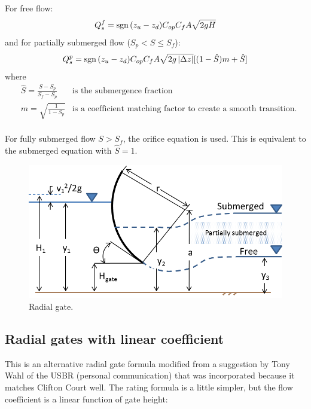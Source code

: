 For free flow:
$$
Q_s^f = \operatorname{sgn}{(z_{u} - z_{d})} C_{op} C_{f} A \sqrt{2g H}
$$
and for partially submerged flow ($S_p < S \le S_f$):
$$
Q_s^p = \operatorname{sgn}{(z_{u} - z_{d})} C_{op} C_{f} A \sqrt{2g \left|\Delta z\right|}[(1-\hat{S})m+\hat{S}]
$$
where
\begin{align*}
&\hat{S}=\frac{S-S_p}{S_f-S_p} & \text{is the submergence fraction} \\
&m = \sqrt{\frac{1}{1-S_p}} & \text{is a coefficient matching factor to create a smooth transition}. \\
\end{align*}

For fully submerged flow $S>S_f$, the orifice equation is used. This is equivalent to the submerged equation with
$\hat{S}=1$.


\begin{figure}
	\centering
		\includegraphics[scale=1]{image/radial_gate}
	\caption{Radial gate.}
	\label{fig:radial}
\end{figure}

\subsection{Radial gates with linear coefficient} 
This is an alternative radial gate formula modified from a suggestion by Tony Wahl of the USBR (personal communication) 
that was incorporated because it matches Clifton Court well. 
The rating formula is a little simpler, but the flow coefficient is a linear function of gate height:

